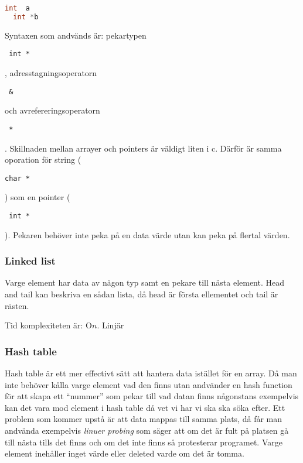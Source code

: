 \begin{multicols}{2}
\begin{lstlisting}[language=C]
  int  a  
  int *b  
\end{lstlisting}
Syntaxen som andvänds är:
pekartypen \begin{verbatim} int * \end{verbatim}, adresstagningsoperatorn \begin{verbatim} & \end{verbatim} och avrefereringsoperatorn \begin{verbatim} * \end{verbatim}.
  Skillnaden mellan arrayer och pointers är väldigt liten i c.
  Därför är samma oporation för string (\begin{verbatim}char *\end{verbatim})
som en pointer (\begin{verbatim} int * \end{verbatim}). Pekaren behöver inte peka på en data värde utan kan peka på flertal värden.



\subsubsection{Linked list}
Varge element har data av någon typ samt en pekare till nästa element.
Head and tail kan beskriva en sådan lista, då head är första ellementet
och tail är rästen.

Tid komplexiteten är: O\(n\). Linjär


\subsubsection{Hash table}
Hash table är ett mer effectivt sätt att hantera data istället för en array.
Då man inte behöver kålla varge element vad den finns utan andvänder en hash
function för att skapa ett ``nummer'' som pekar till vad datan finns någonstans
exempelvis kan det vara mod element i hash table då vet vi har vi ska ska söka efter.
Ett problem som kommer upstå är att data mappas till samma plats, då får man andvända
exempelvis \emph{linuer probing} som säger att om det är fult på platsen gå till nästa tills
det finns och om det inte finns så protesterar programet. Varge element inehåller inget värde
eller deleted varde om det är tomma.


\end{multicols}
